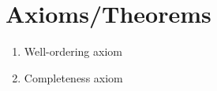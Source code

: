 \documentclass[12pt]{amsart}
\begin{document}
\section*{Axioms/Theorems}

\begin{enumerate}
	\item Well-ordering axiom
	\item Completeness axiom
			\begin{comment}
	\item Theorem 5.3 (large natural numbers)
	\item Archimedean principle
	\item Density of rational numbers / irrational numbers
	\item Triangle inequality

	\item Theorem 10.2 (limits and algebra)

	\item Squeeze Theorem
	\item Monotone convergence theorem

	\item Principle of induction
					
	\item Theorem on convergence and subsequences
	\item Cantor's Theorem

	\item Bolzano-Weierstrass

	\item Main corollary of Bolzano-Weierstrass
	

	\item Theorem on limits and sequences
	\item Theorem on limits of functions and algebra
	\item Squeeze Theorem for functions


	\item Theorem on continuity and limits
	
	\item Theorem on continuity and algebra
	\item Theorem on continuity and compositions
			\item Intermediate Value Theorem
	\item Boundedness Theorem
	\item Extreme Value Theorem
	

	\item Derivatives and algebra 
		\item Derivatives and minima/maxima
	\item Mean Value Theorem
	\item Increasing/decreasing functions and derivatives
\end{comment}
\end{enumerate}
\end{document}
